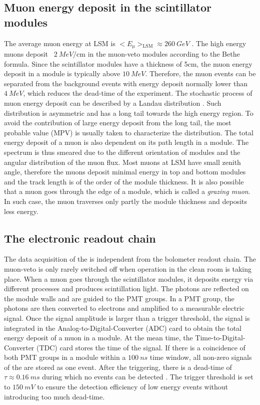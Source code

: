 \subsection{Muon energy deposit in the scintillator modules}
The average muon energy at LSM is $<E_{\upmu}>_{\mathrm{LSM}}\approx \SI{260}{GeV}$ \cite{Klu13}. The high energy muons deposit ~$\SI{2}{MeV\per\cm}$ in the muon-veto modules according to the Bethe formula. Since the scintillator modules have a thickness of 5cm, the muon energy deposit in a module is typically above $\SI{10}{MeV}$. Therefore, the muon events can be separated from the background events with energy deposit normally lower than $\SI{4}{MeV}$, which reduces the dead-time of the experiment.
The stochastic process of muon energy deposit can be described by a Landau distribution \cite{Lan44}. Such distribution is asymmetric and has a long tail towards the high energy region. To avoid the contribution of large energy deposit from the long tail, the most probable value (MPV) is usually taken to characterize the distribution.
The total energy deposit of a muon is also dependent on its path length in a module. The spectrum is thus smeared due to the different orientation of modules and the angular distribution of the muon flux. Most muons at LSM have small zenith angle, therefore the muons deposit minimal energy in top and bottom modules and the track length is of the order of the module thickness.
It is also possible that a muon goes through the edge of a module, which is called a \textit{grazing muon}. In such case, the muon traverses only partly the module thickness and deposits less energy.

\subsection{The electronic readout chain}
The data acquisition of the \mvs{} is independent from the bolometer readout chain. The muon-veto is only rarely switched off when operation in the clean room is taking place.
When a muon goes through the scintillator modules, it deposits energy via different processes and produces scintillation light. The photons are reflected on the module walls and are guided to the PMT groups. In a PMT group, the photons are then converted to electrons and amplified to a measurable electric signal. Once the signal amplitude is larger than a trigger threshold, the signal is integrated in the Analog-to-Digital-Converter (ADC) card to obtain the total energy deposit of a muon in a module. At the mean time, the Time-to-Digital-Converter (TDC) card stores the time of the signal. If there is a coincidence of both PMT groups in a module within a $\SI{100}{ns}$ time window, all non-zero signals of the \mvs{} are stored as one event. After the triggering, there is a dead-time of $\tau\approx\SI{0.16}{ms}$ during which no events can be detected \cite{Sch13b}. The trigger threshold is set to $\SI{150}{mV}$ to ensure the detection efficiency of low energy events without introducing too much dead-time.

